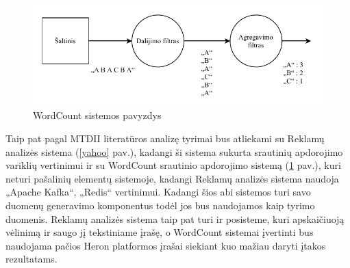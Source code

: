 \documentclass{VUMIFPSbakalaurinis}
\begin{document}
\begin{figure}[H]
    \includegraphics[width=15cm]{img/wordcount.pdf}
    \caption{WordCount sistemos pavyzdys}
    \label{wordcount}
\end{figure} 

Taip pat pagal MTDII literatūros analizę tyrimai bus atliekami su Reklamų analizės sistema (\ref{yahoo} pav.), kadangi ši sistema sukurta srautinių apdorojimo variklių vertinimui ir su WordCount srautinio apdorojimo sistemą (\ref{wordcount} pav.), kuri neturi pašalinių elementų sistemoje, kadangi Reklamų analizės sistema naudoja „Apache Kafka“, „Redis“ vertinimui.
Kadangi šios abi sistemos turi savo duomenų generavimo komponentus todėl jos bus naudojamos kaip tyrimo duomenis. Reklamų analizės sistema taip pat turi ir posisteme, kuri apskaičiuoją vėlinimą ir saugo jį tekstiniame įrašę, o WordCount sistemai įvertinti bus naudojama pačios Heron platformos įrašai siekiant kuo mažiau daryti įtakos rezultatams.
\end{document}
